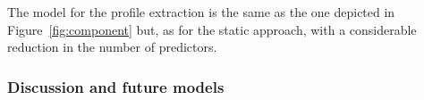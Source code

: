 The model for the profile extraction is the same as the one depicted in Figure~\ref{fig:component} but, as for the static approach, with a considerable reduction in the number of predictors. 
 
%
%
%

\subsubsection{Discussion and future models}

